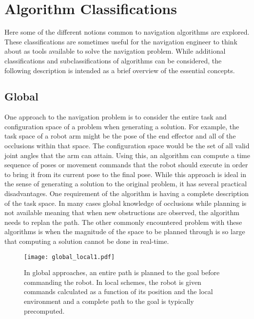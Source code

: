 \section{Algorithm Classifications}
Here some of the different notions common to navigation algorithms are explored. These classifications are sometimes useful
for the navigation engineer to think about as tools available to solve the navigation problem. While additional classifications
and subclassifications of algorithms can be considered, the following description is intended as a brief overview of the 
essential concepts.

\subsection{Global}
One approach to the navigation problem is to consider the entire task and configuration space of a problem when generating
a solution. For example, the task space of a robot arm might be the pose of the end effector and all of the occlusions
within that space. The configuration space would be the set of all valid joint angles that the arm can attain. Using this,
an algorithm can compute a time sequence of poses or movement commands that the robot should execute in order to bring it
from its current pose to the final pose. While this approach is ideal in the sense of generating a solution to the 
original problem, it has several practical disadvantages. One requirement of the algorithm is having a complete description 
of the task space. In many cases global knowledge of occlusions while planning is not available meaning that when new
obstructions are observed, the algorithm needs to replan the path. The other commonly encountered problem with these
algorithms is when the magnitude of the space to be planned through is so large that computing a solution cannot be done
in real-time.
\begin{figure}
\centering
\texttt{[image: global\_local1.pdf]}
\caption{In global approaches, an entire path is planned to the goal before commanding the robot. In local 
         schemes, the robot is given commands calculated as a function of its position and the local environment and
	     a complete path to the goal is typically precomputed.}
\label{fig:global_vs_local1}
\end{figure}

